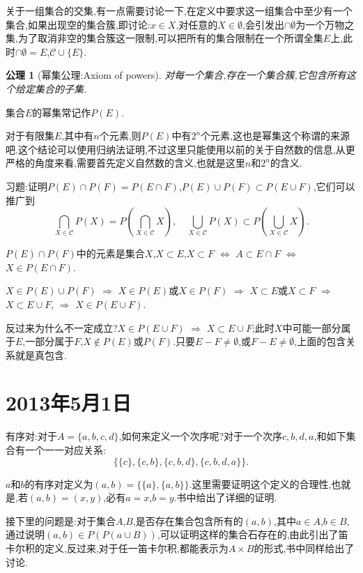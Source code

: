 \documentclass[12pt,a4paper,openany]{book}
\newtheorem{axiom}{公理}[section]
\begin{document}
关于一组集合的交集,有一点需要讨论一下,在定义中要求这一组集合中至少有一个集合,如果出现空的集合簇,即讨论:$x \in X$,对任意的$X \in \emptyset$,会引发出$\cap{\emptyset}$为一个万物之集,为了取消非空的集合簇这一限制,可以把所有的集合限制在一个所谓全集$E$上,此时$\cap{\emptyset}=E$,$\mathscr{C} \cup \{E\}$.

\begin{axiom}[幂集公理:Axiom of powers]
对每一个集合,存在一个集合簇,它包含所有这个给定集合的子集.
\end{axiom}

集合$E$的幂集常记作$P(E)$.

对于有限集$E$,其中有$n$个元素,则$P(E)$中有$2^n$个元素,这也是幂集这个称谓的来源吧.这个结论可以使用归纳法证明,不过这里只能使用以前的关于自然数的信息,从更严格的角度来看,需要首先定义自然数的含义,也就是这里$n$和$2^n$的含义.

习题:证明$P(E) \cap P(F) = P(E \cap F)$,$P(E) \cup P(F) \subset P(E \cup F)$,它们可以推广到
\[
\bigcap_{X \in \mathscr{C}}{P(X)} = P(\bigcap_{X \in \mathscr{C}}{X}),\quad \bigcup_{X \in \mathscr{C}}{P(X)} \subset P(\bigcup_{X \in \mathscr{C}}{X}).
\]

$P(E) \cap P(F)$中的元素是集合$X$,$X \subset E$,$X \subset F$ $\Leftrightarrow$ $A \subset E \cap F$ $\Leftrightarrow$ $X \in P(E \cap F)$.

$X \in P(E) \cup P(F)$ $\Rightarrow$ $X \in P(E)$或$X \in P(F)$ $\Rightarrow$ $X \subset E$或$X \subset F$ $\Rightarrow$ $X \subset E \cup F$, $\Rightarrow$ $X \in P(E \cup F)$.

反过来为什么不一定成立?$X \in P(E \cup F)$ $\Rightarrow$ $X \subset E \cup F$;此时$X$中可能一部分属于$E$,一部分属于$F$,$X \notin P(E)$或$P(F)$.只要$E-F\neq \emptyset$,或$F-E \neq \emptyset$,上面的包含关系就是真包含.

\section{2013年5月1日}
有序对:对于$A=\{a,b,c,d\}$,如何来定义一个次序呢?对于一个次序$c,b,d,a$,和如下集合有一个一一对应关系:
\[
\{\{c\},\{c,b\},\{c,b,d\},\{c,b,d,a\}\}.
\]

$a$和$b$的有序对定义为$(a,b)=\{\{a\}, \{a,b\}\}$.这里需要证明这个定义的合理性,也就是,若$(a,b)=(x,y)$,必有$a=x$,$b=y$.书中给出了详细的证明.

接下里的问题是:对于集合$A$,$B$,是否存在集合包含所有的$(a,b)$,其中$a \in A$,$b \in B$,通过说明$(a,b) \in P(P(a \cup B))$,可以证明这样的集合石存在的,由此引出了笛卡尔积的定义,反过来,对于任一笛卡尔积,都能表示为$A \times B$的形式,书中同样给出了讨论.
\end{document}
